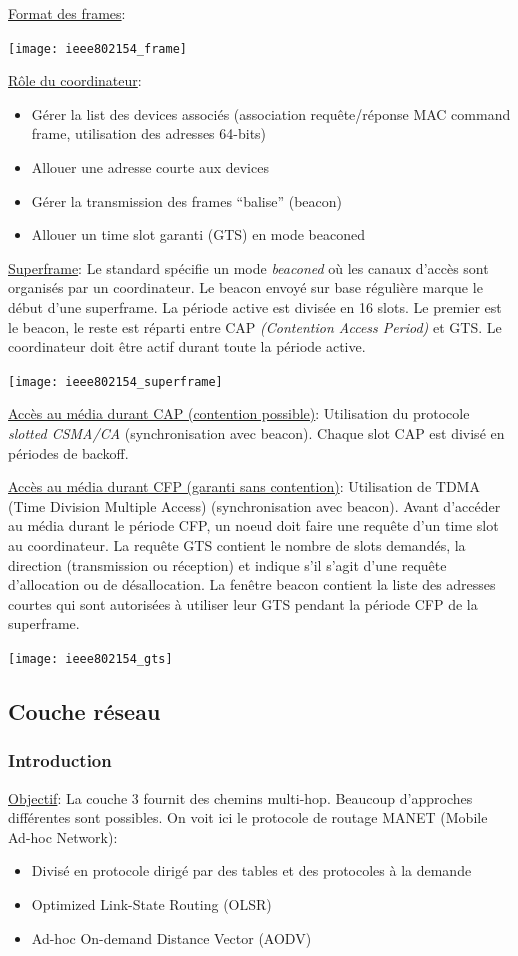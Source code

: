 \documentclass{article}
\begin{document}
\begin{sffamily}
\underline{Format des frames}:

\texttt{[image: ieee802154\_frame]}

\underline{Rôle du coordinateur}:
\begin{itemize}
\item Gérer la list des devices associés (association requête/réponse MAC
  command frame, utilisation des adresses 64-bits)
\item Allouer une adresse courte aux devices
\item Gérer la transmission des frames ``balise'' (beacon)
\item Allouer un time slot garanti (GTS) en mode beaconed
\end{itemize}

\underline{Superframe}:
Le standard spécifie un mode \textit{beaconed} où les canaux d'accès sont
organisés par un coordinateur. Le beacon envoyé sur base régulière marque le
début d'une superframe.
La période active est divisée en 16 slots. Le premier est le beacon,
le reste est réparti entre CAP \textit{(Contention Access Period)} et GTS.
Le coordinateur doit être actif durant toute la période active.

\texttt{[image: ieee802154\_superframe]}

\underline{Accès au média durant CAP (contention possible)}:
Utilisation du protocole \textit{slotted CSMA/CA} (synchronisation
avec beacon). Chaque slot CAP est divisé en périodes de backoff.

\underline{Accès au média durant CFP (garanti sans contention)}:
Utilisation de TDMA (Time Division Multiple Access) (synchronisation
avec beacon). Avant d'accéder au média durant le période CFP, un noeud doit
faire une requête d'un time slot au coordinateur.
La requête GTS contient le nombre de slots demandés, la direction (transmission
ou réception) et indique s'il s'agit d'une requête d'allocation ou
de désallocation.
La fenêtre beacon contient la liste des adresses courtes qui sont autorisées
à utiliser leur GTS pendant la période CFP de la superframe.

\texttt{[image: ieee802154\_gts]}


\subsection{Couche réseau}
\subsubsection{Introduction}
\underline{Objectif}:
La couche 3 fournit des chemins multi-hop. Beaucoup d'approches différentes
sont possibles. On voit ici le protocole de routage MANET
(Mobile Ad-hoc Network):
\begin{itemize}
\item Divisé en protocole dirigé par des tables et des protocoles à la demande
\item Optimized Link-State Routing (OLSR)
\item Ad-hoc On-demand Distance Vector (AODV)
\end{itemize}


\end{sffamily}
\end{document}
